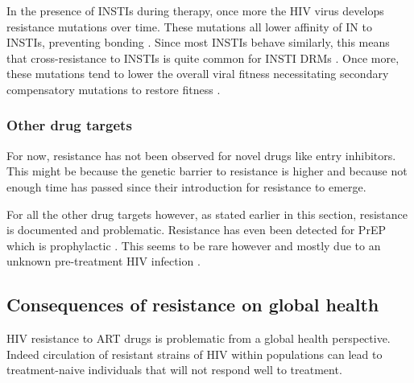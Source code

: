 \documentclass[
  11pt,
  twoside,
  BCOR=10mm,
  listof=totoc]{scrbook}
\begin{document}
In the presence of INSTIs during therapy, once more the HIV virus develops resistance mutations over time. These mutations all lower affinity of IN to INSTIs, preventing bonding \autocite{blancoHIV1IntegraseInhibitor2011,maertensStructureFunctionRetroviral2022}. Since most INSTIs behave similarly, this means that cross-resistance to INSTIs is quite common for INSTI DRMs \autocite{blancoHIV1IntegraseInhibitor2011,gerettiEmergingPatternsImplications2012}. Once more, these mutations tend to lower the overall viral fitness necessitating secondary compensatory mutations to restore fitness \autocite{gerettiEmergingPatternsImplications2012,blancoHIV1IntegraseInhibitor2011}.

\hypertarget{other-drug-targets}{%
\subsubsection{Other drug targets}\label{other-drug-targets}}

For now, resistance has not been observed for novel drugs like entry inhibitors. This might be because the genetic barrier to resistance is higher and because not enough time has passed since their introduction for resistance to emerge.

For all the other drug targets however, as stated earlier in this section, resistance is documented and problematic. Resistance has even been detected for PrEP which is prophylactic \autocite{knoxMultidrugResistantHIV1Infection2017,hurtPreexposureProphylaxisAntiretroviral2011}. This seems to be rare however and mostly due to an unknown pre-treatment HIV infection \autocite{gibasDrugResistanceHIV2019}.

\hypertarget{consequences-of-resistance-on-global-health}{%
\subsection{Consequences of resistance on global health}\label{consequences-of-resistance-on-global-health}}

HIV resistance to ART drugs is problematic from a global health perspective. Indeed circulation of resistant strains of HIV within populations can lead to treatment-naive individuals that will not respond well to treatment.
\end{document}
